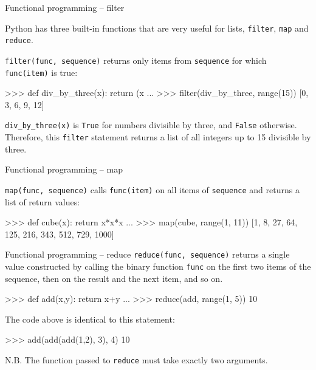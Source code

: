 \documentclass[xetex,10pt]{beamer}
\def\pythoni{\lstinline[language=pythontim]}
\def\spacer{\vspace*{1em}}
\begin{document}
\begin{frame}[fragile]{Functional programming -- filter}
	
	Python has three built-in functions that are very useful for lists, \pythoni{filter}, \pythoni{map} and \pythoni{reduce}.
	
	\spacer
	
	\pythoni{filter(func, sequence)} returns only items from \pythoni{sequence} for which \pythoni{func(item)} is true:
	
	\spacer
	
	\begin{python}
	>>> def div_by_three(x): return (x %
	...
	>>> filter(div_by_three, range(15))
	[0, 3, 6, 9, 12]
	\end{python}
	
	\spacer
	
	\pythoni{div_by_three(x)} is \pythoni{True} for numbers divisible by three, and \pythoni{False} otherwise. Therefore, this \pythoni{filter} statement returns a list of all integers up to 15 divisible by three.
	
	
\end{frame}

\begin{frame}[fragile]{Functional programming -- map}

	\pythoni{map(func, sequence)} calls \pythoni{func(item)} on all items of \pythoni{sequence} and returns a list of return values:

	\spacer
	
	\begin{python}
>>> def cube(x): return x*x*x
...
>>> map(cube, range(1, 11))
[1, 8, 27, 64, 125, 216, 343, 512, 729, 1000]
	\end{python}
\end{frame}

\begin{frame}[fragile]{Functional programming -- reduce}
	\pythoni{reduce(func, sequence)} returns a single value constructed by calling the binary function \pythoni{func} on the first two items of the sequence, then on the result and the next item, and so on.
	
	\spacer
\begin{python}
>>> def add(x,y): return x+y
...
>>> reduce(add, range(1, 5))
10
\end{python}
\spacer
The code above is identical to this statement:
\begin{python}
>>> add(add(add(1,2), 3), 4)
10
\end{python}
\spacer
N.B. The function passed to \pythoni{reduce} must take exactly two arguments.


\end{frame}
\end{document}
